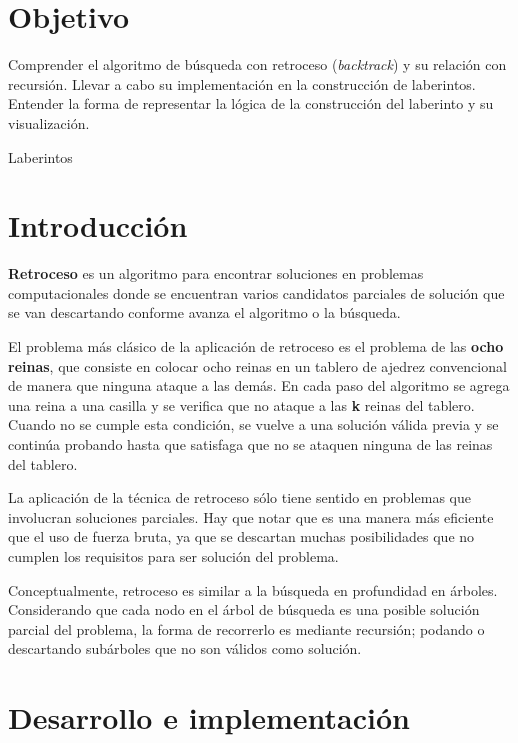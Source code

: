 

\section{Objetivo}
Comprender el algoritmo de búsqueda con retroceso (\textit{backtrack}) y su relación con recursión. Llevar a cabo su implementación en la construcción de laberintos. Entender la forma de representar la lógica de la construcción del laberinto y su visualización. \par


\begin{auxcode}
 \caption{Laberintos}
 \centering
\end{auxcode}


\section{Introducci\'on}

\textbf{Retroceso} es un algoritmo para encontrar soluciones en problemas computacionales donde se encuentran varios candidatos parciales de solución que se van descartando conforme avanza el algoritmo o la búsqueda.

El problema más clásico de la aplicación de retroceso es el problema de las \textbf{ocho reinas}, que consiste en colocar ocho reinas en un tablero de ajedrez convencional de manera que ninguna ataque a las demás. En cada paso del algoritmo se agrega una reina a una casilla y se verifica que no ataque a las \textbf{k} reinas del tablero. Cuando no se cumple esta condición, se vuelve a una solución válida previa y se continúa probando hasta que satisfaga que no se ataquen ninguna de las reinas del tablero.\par

La aplicación de la técnica de retroceso sólo tiene sentido en problemas que involucran soluciones parciales. Hay que notar que es una manera más eficiente que el uso de fuerza bruta, ya que se descartan muchas posibilidades que no cumplen los requisitos para ser solución del problema.

Conceptualmente, retroceso es similar a la búsqueda en profundidad en árboles. Considerando que cada nodo en el árbol de búsqueda es una posible solución parcial del problema, la forma de recorrerlo es mediante recursión; podando o descartando subárboles que no son válidos como solución.\par


\section{Desarrollo e implementaci\'on}

